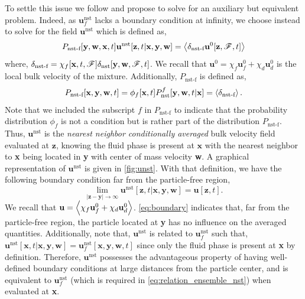 To settle this issue we follow \citet[Appendix B]{zhang2021ensemble} and propose to solve for an auxiliary but equivalent problem.
Indeed, as $\textbf{u}_f^\text{nst}$ lacks a boundary condition at infinity, we choose instead to solve for the field $\textbf{u}^\text{nst}$ which is defined as,  
\begin{equation*}
    P_\text{nst-f}[\textbf{y},\textbf{w},\textbf{x},t]\textbf{u}^\text{nst}[\textbf{z},t|\textbf{x},\textbf{y},\textbf{w}]
    = \avg{\delta_\text{nst-f}  \textbf{u}^0[\textbf{z},\FF,t]}
    \label{eq:def_u_z}
\end{equation*}
where, $\delta_\text{nst-f} = \chi_f[\textbf{x},t,\mathscr{F}]\delta_\text{nst}[\textbf{y},\textbf{w}, \mathscr{F},t]$. 
We recall that $\textbf{u}^0 = \chi_f\textbf{u}_f^0 + \chi_d \textbf{u}_d^0$ is the local bulk velocity of the mixture. 
Additionally, $P_\text{nst-f}$ is defined as,
\begin{equation}
    P_\text{nst-f}[\textbf{x},\textbf{y},\textbf{w},t] = \phi_f[\textbf{x},t]P_\text{nst}^f[\textbf{y},\textbf{w},t|\textbf{x}] = \left<\delta_\text{nst-f}\right>. 
\end{equation}
Note that we included the subscript $f$ in $P_\text{nst-f}$ to indicate that the probability distribution $\phi_f$ is not a condition but is rather part of the distribution $P_\text{nst-f}$.
Thus, $\textbf{u}^\text{nst}$ is the \textit{nearest neighbor conditionally averaged} bulk velocity field evaluated at $\textbf{z}$, knowing the fluid phase is present at $\textbf{x}$ with the nearest neighbor to \textbf{x} being located in \textbf{y} with center of mass velocity \textbf{w}. 
A graphical representation of $\textbf{u}^\text{nst}$ is given in \ref{fig:unst}.
With that definition, we have the following boundary condition far from the particle-free region, 
\begin{equation}
    \lim_{|\textbf{z} - \textbf{y}|\to \infty}
    \textbf{u}^\text{nst}[\textbf{z},t|\textbf{x},\textbf{y},\textbf{w}]
    = \textbf{u}[\textbf{z},t]. 
    \label{eq:boundary}
\end{equation}
We recall that $\textbf{u} = \left<\chi_f\textbf{u}_f^0 + \chi_d \textbf{u}_d^0\right>$. 
\ref{eq:boundary} indicates that, far from the particle-free region, the particle located at \textbf{y} has no influence on the averaged quantities.
Additionally, note that, $\textbf{u}^\text{nst}$ is related to $\textbf{u}_f^\text{nst}$ such that, $\textbf{u}^\text{nst}[\textbf{x},t|\textbf{x},\textbf{y},\textbf{w}] = \textbf{u}_f^\text{nst}[\textbf{x},\textbf{y},\textbf{w},t]$ since only the fluid phase is present at \textbf{x} by definition. 
Therefore, $\textbf{u}^\text{nst}$ possesses the advantageous property of having well-defined boundary conditions at large distances from the particle center, and is equivalent to $\textbf{u}_f^\text{nst}$ (which is required in \ref{eq:relation_ensemble_nst}) when evaluated at \textbf{x}. 


